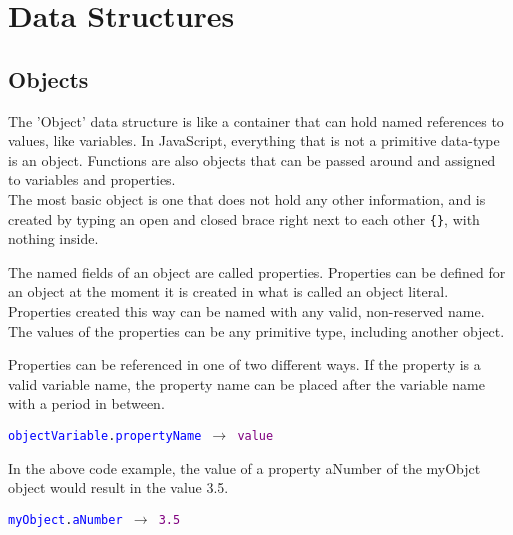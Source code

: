 

\chapter{Data Structures}

\section{Objects}

The 'Object' data structure is like a container that can hold named references to values, like variables. In JavaScript, everything that is not a primitive data-type is an object. Functions are also objects that can be passed around and assigned to variables and properties.\\

The most basic object is one that does not hold any other information, and is created by typing an open and closed brace right next to each other \texttt{\{\}}, with nothing inside.



The named fields of an object are called properties. Properties can be defined for an object at the moment it is created in what is called an object literal. Properties created this way can be named with any valid, non-reserved name. The values of the properties can be any primitive type, including another object.



Properties can be referenced in one of two different ways. If the property is a valid variable name, the property name can be placed after the variable name with a period in between.

\begin{center}
	\texttt{\textcolor{blue}{objectVariable}.\textcolor{blue}{propertyName}  $\rightarrow$ \textcolor{purple}{value}}
\end{center}

In the above code example, the value of a property aNumber of the myObjct object would result in the value 3.5.

 \begin{center}
 	\texttt{\textcolor{blue}{myObject}.\textcolor{blue}{aNumber}  $\rightarrow$ \textcolor{purple}{3.5}}
 \end{center}
 
